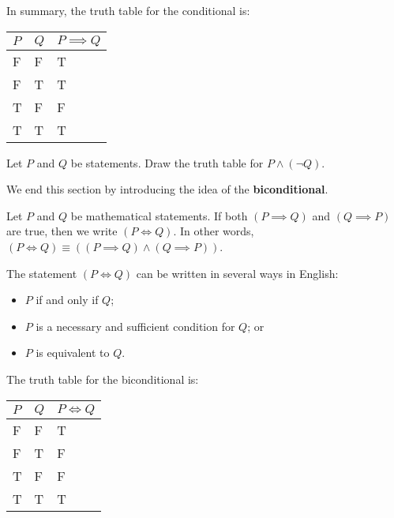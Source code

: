 \newpage

In summary, the truth table for the conditional is:
\begin{table}[h]
    \centering
    \begin{tabular}{|l|l||l|}
        \hline
        $P$ & $Q$ & $P\implies Q$ \\ \hline
        F   & F   & T             \\ \hline
        F   & T   & T             \\ \hline
        T   & F   & F             \\ \hline
        T   & T   & T             \\ \hline
    \end{tabular}
\end{table}

\begin{exercise}
    Let $P$ and $Q$ be statements. Draw the truth table for $P \land (\lnot Q)$.
\end{exercise}

We end this section by introducing the idea of the \textbf{biconditional}.
\begin{definition}
    Let $P$ and $Q$ be mathematical statements. If both $(P \implies Q)$ and $(Q \implies P)$ are true, then we write $(P \iff Q)$. In other words, $(P \iff Q) \equiv ((P \implies Q) \land (Q \implies P))$.
\end{definition}
\begin{remark}
    The statement $(P \iff Q)$ can be written in several ways in English:
    \begin{itemize}
        \item $P$ if and only if $Q$;
        \item $P$ is a necessary and sufficient condition for $Q$; or
        \item $P$ is equivalent to $Q$.
    \end{itemize}
\end{remark}

\newpage

The truth table for the biconditional is:
\begin{table}[h]
    \centering
    \begin{tabular}{|l|l||l|}
        \hline
        $P$ & $Q$ & $P\iff Q$ \\ \hline
        F   & F   & T         \\ \hline
        F   & T   & F         \\ \hline
        T   & F   & F         \\ \hline
        T   & T   & T         \\ \hline
    \end{tabular}
\end{table}

